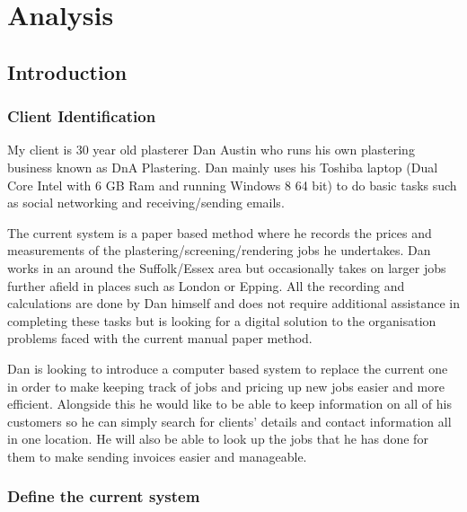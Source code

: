 \chapter{Analysis}

\section{Introduction}

\subsection{Client Identification}

	\begin{flushleft}

		My client is 30 year old plasterer Dan Austin who runs his own plastering business known as DnA Plastering. Dan mainly uses his Toshiba laptop (Dual Core Intel with 6 GB Ram and running Windows 8 64 bit) to do basic tasks such as social networking and receiving/sending emails. \par

The current system is a paper based method where he records the prices and measurements of the plastering/screening/rendering jobs he undertakes. Dan works in an around the Suffolk/Essex area but occasionally takes on larger jobs further afield in places such as London or Epping. All the recording and calculations are done by Dan himself and does not require additional assistance in completing these tasks but is looking for a digital solution to the organisation problems faced with the current manual paper method. \par

Dan is looking to introduce a computer based system to replace the current one in order to make keeping track of jobs and pricing up new jobs easier and more efficient. Alongside this he would like to be able to keep information on all of his customers so he can simply search for clients' details and contact information all in one location. He will also be able to look up the jobs that he has done for them to make sending invoices easier and manageable.

		
	\end{flushleft}

\subsection{Define the current system}

